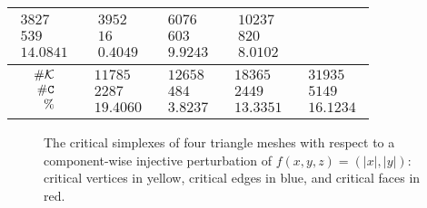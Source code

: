 \documentclass[12pt]{article}
\newcommand{\cK}{{\cal K}}
\newcommand{\sC}{\texttt{C}} \newcommand{\sD}{\texttt{D}} \newcommand{\sM}{\texttt{M}} \newcommand{\sL}{\texttt{L}}
\begin{document}
\begin{table}
\begin{tabular}{| c | c | c | c | c |}
 $\begin{array}{rrr}3827\\539\\  14.0841 \end{array}$ &
 $\begin{array}{rrr}3952\\16\\  0.4049 \end{array}$&
 $\begin{array}{rrr}6076\\603\\   9.9243 \end{array}$ &
 $\begin{array}{rrr}10237\\820\\  8.0102 \end{array}$ \\
 \hline
  $\begin{array}{rrr}\# \cK\\ \# \sC\\ \% \end{array}$ &
 $\begin{array}{rrr}11785\\2287 \\ 19.4060  \end{array}$ &
 $\begin{array}{rrr}12658\\484 \\3.8237  \end{array}$ &
 $\begin{array}{rrr}18365\\  2449\\ 13.3351 \end{array}$ &
 $\begin{array}{rrr}31935\\5149 \\ 16.1234 \end{array}$\\
 \hline
 \end{tabular}
\label{tab:space}
\end{table}

\begin{figure}
\begin{center}
  \caption{The critical simplexes of four triangle meshes with respect to a component-wise injective perturbation of $f(x,y,z)=(|x|,|y|)$: critical vertices  in yellow,  critical edges  in blue,  and  critical faces  in red.
 }
\end{center}
\label{fig:space}
\end{figure}
\end{document}
